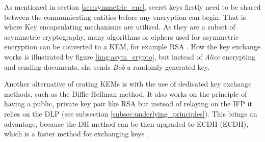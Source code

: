 As mentioned in section \ref{sec:symmetric_enc}, secret keys firstly need to be shared between the communicating entities before any encryption can begin. That is where Key encapsulating mechanisms are utilized. As they are a subset of asymmetric cryptography, many algorithms or ciphers used for asymmetric encryption can be converted to a KEM, for example RSA \cite{Ristic2014}. How the key exchange works is illustrated by figure \ref{img:asym_crypto}, but instead of \textit{Alice} encrypting and sending documents, she sends \textit{Bob} a randomly generated key.

Another alternative of crating KEMs is with the use of dedicated key exchange methods, such as the Diffie-Hellman method. It also works on the principle of having a public, private key pair like RSA but instead of relaying on the IFP it relies on the DLP (see subsection \ref{subsec:underlying_principles}). This brings an advantage, because the DH method can be then upgraded to \acl{ECDH} (ECDH), which is a faster method for exchanging keys \cite{Ristic2014}.